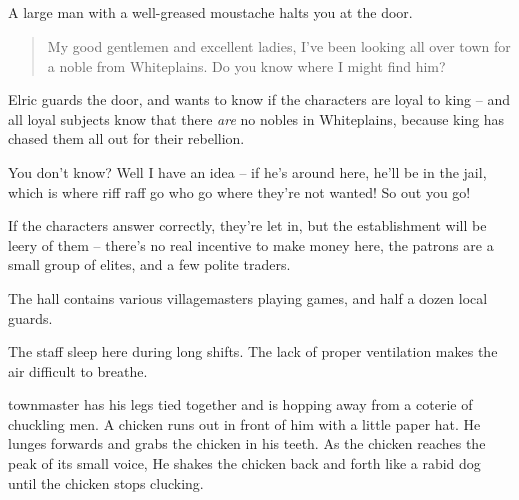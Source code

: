 \begin{multicols}{2}

\subsection{}


\begin{boxtext}

	A large man with a well-greased moustache halts you at the door.

	\begin{quotation}

		My good gentlemen and excellent ladies, I've been looking all over town for a noble from Whiteplains.  Do you know where I might find him?

	\end{quotation}

\end{boxtext}

Elric guards the door, and wants to know if the characters are loyal to \gls{king} -- and all loyal subjects know that there \emph{are} no nobles in Whiteplains, because \gls{king} has chased them all out for their rebellion.

\begin{speechtext}

	You don't know?  Well I have an idea -- if he's around here, he'll be in the jail, which is where riff raff go who go where they're not wanted!
	So out you go!

\end{speechtext}

If the characters answer correctly, they're let in, but the establishment will be leery of them -- there's no real incentive to make money here, the patrons are a small group of elites, and a few polite traders.

The hall contains various villagemasters playing games, and half a dozen local guards.


The staff sleep here during long shifts.  The lack of proper ventilation makes the air difficult to breathe.


\begin{boxtext}

	\Gls{townmaster} has his legs tied together and is hopping away from a coterie of chuckling men.
	 A chicken runs out in front of him with a little paper hat.
	 He lunges forwards and grabs the chicken in his teeth.
	 As the chicken reaches the peak of its small voice, He shakes the chicken back and forth like a rabid dog until the chicken stops clucking.


\end{boxtext}
\end{multicols}
